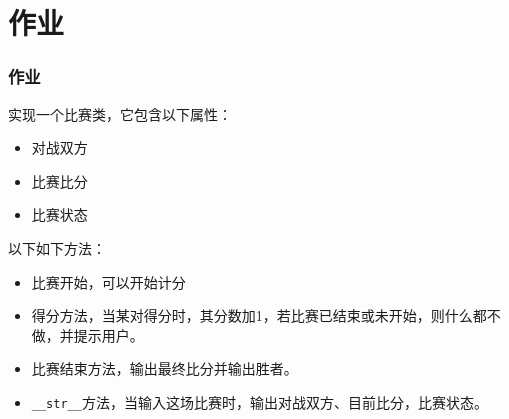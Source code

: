 \documentclass[9pt]{beamer}
\begin{document}
\section{作业}

\begin{frame}
    \frametitle{作业}

    实现一个比赛类，它包含以下属性：

    \begin{itemize}
        \item 对战双方
        \item 比赛比分
        \item 比赛状态
    \end{itemize}

    以下如下方法：

    \begin{itemize}
        \item 比赛开始，可以开始计分
        \item 得分方法，当某对得分时，其分数加1，若比赛已结束或未开始，则什么都不做，并提示用户。
        \item 比赛结束方法，输出最终比分并输出胜者。
        \item \texttt{__str__}方法，当输入这场比赛时，输出对战双方、目前比分，比赛状态。
    \end{itemize}

\end{frame}
\end{document}
